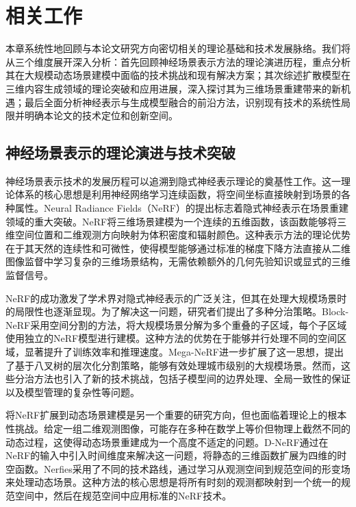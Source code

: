 
\chapter{相关工作}

本章系统性地回顾与本论文研究方向密切相关的理论基础和技术发展脉络。我们将从三个维度展开深入分析：首先回顾神经场景表示方法的理论演进历程，重点分析其在大规模动态场景建模中面临的技术挑战和现有解决方案；其次综述扩散模型在三维内容生成领域的理论突破和应用进展，深入探讨其为三维场景重建带来的新机遇；最后全面分析神经表示与生成模型融合的前沿方法，识别现有技术的系统性局限并明确本论文的技术定位和创新空间。

\section{神经场景表示的理论演进与技术突破}

神经场景表示技术的发展历程可以追溯到隐式神经表示理论的奠基性工作。这一理论体系的核心思想是利用神经网络学习连续函数，将空间坐标直接映射到场景的各种属性。Neural Radiance Fields（NeRF）的提出标志着隐式神经表示在场景重建领域的重大突破\cite{mildenhall2021nerf}。NeRF将三维场景建模为一个连续的五维函数，该函数能够将三维空间位置和二维观测方向映射为体积密度和辐射颜色。这种表示方法的理论优势在于其天然的连续性和可微性，使得模型能够通过标准的梯度下降方法直接从二维图像监督中学习复杂的三维场景结构，无需依赖额外的几何先验知识或显式的三维监督信号。

NeRF的成功激发了学术界对隐式神经表示的广泛关注，但其在处理大规模场景时的局限性也逐渐显现。为了解决这一问题，研究者们提出了多种分治策略。Block-NeRF采用空间分割的方法，将大规模场景分解为多个重叠的子区域，每个子区域使用独立的NeRF模型进行建模\cite{blocknerf2022}。这种方法的优势在于能够并行处理不同的空间区域，显著提升了训练效率和推理速度。Mega-NeRF进一步扩展了这一思想，提出了基于八叉树的层次化分割策略，能够有效处理城市级别的大规模场景\cite{meganeRF2022}。然而，这些分治方法也引入了新的技术挑战，包括子模型间的边界处理、全局一致性的保证以及模型管理的复杂性等问题。

将NeRF扩展到动态场景建模是另一个重要的研究方向，但也面临着理论上的根本性挑战。给定一组二维观测图像，可能存在多种在数学上等价但物理上截然不同的动态过程，这使得动态场景重建成为一个高度不适定的问题。D-NeRF通过在NeRF的输入中引入时间维度来解决这一问题，将静态的三维函数扩展为四维的时空函数\cite{dnerf2021}。Nerfies采用了不同的技术路线，通过学习从观测空间到规范空间的形变场来处理动态场景\cite{nerfies2021}。这种方法的核心思想是将所有时刻的观测都映射到一个统一的规范空间中，然后在规范空间中应用标准的NeRF技术。

